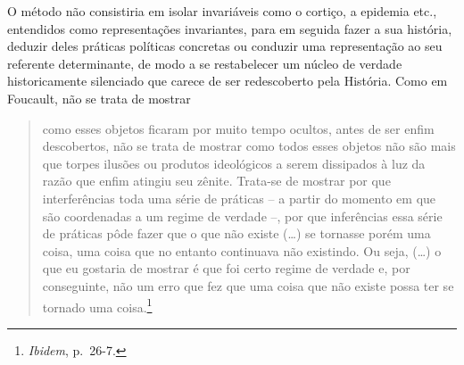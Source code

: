 O método não consistiria em isolar invariáveis como o cortiço, a
epidemia etc., entendidos como representações invariantes, para em
seguida fazer a sua história, deduzir deles práticas políticas concretas
ou conduzir uma representação ao seu referente determinante, de modo a
se restabelecer um núcleo de verdade historicamente silenciado que
carece de ser redescoberto pela História. Como em Foucault, não se trata
de mostrar

\begin{quote}
como esses objetos ficaram por muito tempo ocultos, antes de ser enfim
descobertos, não se trata de mostrar como todos esses objetos não são
mais que torpes ilusões ou produtos ideológicos a serem dissipados à luz
da razão que enfim atingiu seu zênite. Trata-se de mostrar por que
interferências toda uma série de práticas -- a partir do momento em que
são coordenadas a um regime de verdade --, por que inferências essa
série de práticas pôde fazer que o que não existe (\ldots{}) se tornasse
porém uma coisa, uma coisa que no entanto continuava não existindo. Ou
seja, (\ldots{}) o que eu gostaria de mostrar é que foi certo regime de
verdade e, por conseguinte, não um erro que fez que uma coisa que não
existe possa ter se tornado uma coisa.\footnote{\emph{Ibidem}, p.~26-7.}
\end{quote}

